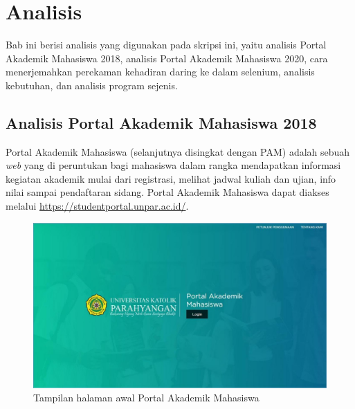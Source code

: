 \chapter{Analisis}
\label{chap:analisis}
Bab ini berisi analisis yang digunakan pada skripsi ini, yaitu analisis Portal Akademik Mahasiswa 2018, analisis Portal Akademik Mahasiswa 2020, cara menerjemahkan perekaman kehadiran daring ke dalam selenium, analisis kebutuhan, dan analisis program sejenis.

\section{Analisis Portal Akademik Mahasiswa 2018}
\label{sec:pam} 
Portal Akademik Mahasiswa (selanjutnya disingkat dengan PAM) adalah sebuah \textit{web} yang di peruntukan bagi mahasiswa dalam rangka mendapatkan informasi kegiatan akademik mulai dari registrasi, melihat jadwal kuliah dan ujian, info nilai sampai pendaftaran sidang\cite{portalunpar}. Portal Akademik Mahasiswa dapat diakses melalui \url{https://studentportal.unpar.ac.id/}. 

\begin{figure}[H]
	\centering
	\includegraphics[scale=0.4]{Gambar/halaman2018.jpg}
	\caption{Tampilan halaman awal Portal Akademik Mahasiswa} 
	\label{fig:studpor_home_2018}
\end{figure}

